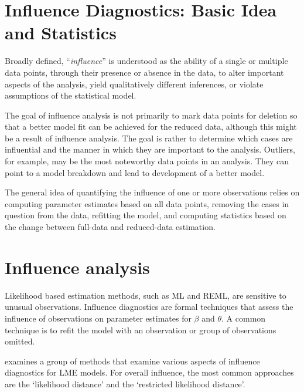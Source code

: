 \documentclass[Main.tex]{subfiles}
\begin{document}
	

\tableofcontents

\section{Influence Diagnostics: Basic Idea and Statistics} %
Broadly defined, ``\textit{influence}” is understood as the ability of a single or multiple data points, through their presence or absence in the data, to alter important aspects of the analysis, yield qualitatively different inferences, or
		violate assumptions of the statistical model. 
		
		
		The goal of influence analysis is not primarily to mark data
		points for deletion so that a better model fit can be achieved for the reduced data, although this might be a
		result of influence analysis. The goal is rather to determine which cases are influential and the manner in
		which they are important to the analysis. Outliers, for example, may be the most noteworthy data points in
		an analysis. They can point to a model breakdown and lead to development of a better model.
		
		
		The general idea of quantifying the influence of one or more observations relies on computing parameter estimates based on all data points, removing the cases in question from the data, refitting the model, and computing statistics based on the change between full-data and reduced-data estimation. 

		\newpage
		\section{Influence analysis} %
		
		Likelihood based estimation methods, such as ML and REML, are sensitive to unusual observations. Influence diagnostics are formal techniques that assess the influence of observations on parameter estimates for $\beta$ and $\theta$. A common technique is to refit the model with an observation or group of observations omitted.
		
		\citet{west} examines a group of methods that examine various aspects of influence diagnostics for LME models.
		For overall influence, the most common approaches are the `likelihood distance' and the `restricted likelihood distance'.
\end{document}

